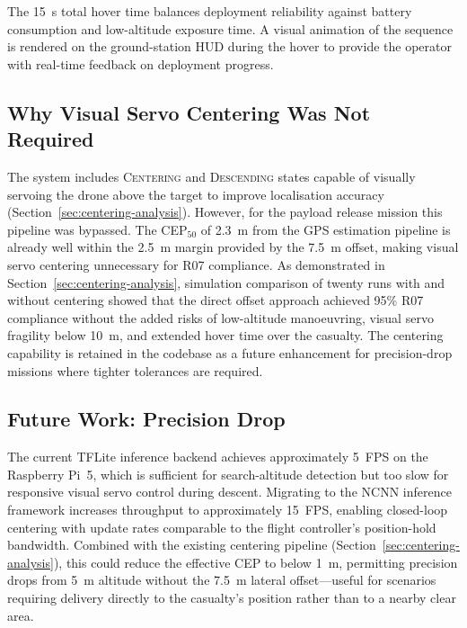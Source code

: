 The \SI{15}{\second} total hover time balances deployment reliability against battery consumption and low-altitude exposure time. A visual animation of the sequence is rendered on the ground-station HUD during the hover to provide the operator with real-time feedback on deployment progress.

\subsection{Why Visual Servo Centering Was Not Required}

The system includes \textsc{Centering} and \textsc{Descending} states capable of visually servoing the drone above the target to improve localisation accuracy (Section~\ref{sec:centering-analysis}). However, for the payload release mission this pipeline was bypassed. The CEP$_{50}$ of \SI{2.3}{\metre} from the GPS estimation pipeline is already well within the \SI{2.5}{\metre} margin provided by the \SI{7.5}{\metre} offset, making visual servo centering unnecessary for R07 compliance. As demonstrated in Section~\ref{sec:centering-analysis}, simulation comparison of twenty runs with and without centering showed that the direct offset approach achieved 95\% R07 compliance without the added risks of low-altitude manoeuvring, visual servo fragility below \SI{10}{\metre}, and extended hover time over the casualty. The centering capability is retained in the codebase as a future enhancement for precision-drop missions where tighter tolerances are required.

\subsection{Future Work: Precision Drop}

The current TFLite inference backend achieves approximately \SI{5}{FPS} on the Raspberry Pi~5, which is sufficient for search-altitude detection but too slow for responsive visual servo control during descent.  Migrating to the NCNN inference framework increases throughput to approximately \SI{15}{FPS}, enabling closed-loop centering with update rates comparable to the flight controller's position-hold bandwidth.  Combined with the existing centering pipeline (Section~\ref{sec:centering-analysis}), this could reduce the effective CEP to below \SI{1}{\metre}, permitting precision drops from \SI{5}{\metre} altitude without the \SI{7.5}{\metre} lateral offset---useful for scenarios requiring delivery directly to the casualty's position rather than to a nearby clear area.
